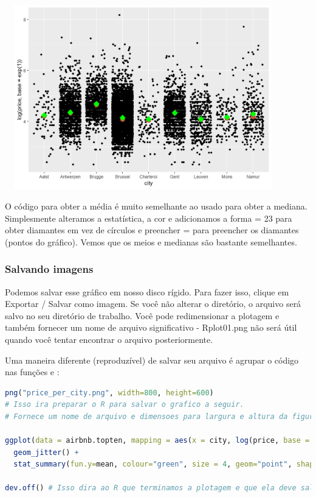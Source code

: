 \documentclass{article}
\begin{document}
\begin{center}
\includegraphics[width=12cm,height=8cm]{intro_plot_mean-1.png}
\end{center}

O código para obter a média é muito semelhante ao usado para obter a mediana. Simplesmente alteramos a estatística, a cor e adicionamos a forma = 23 para obter diamantes em vez de círculos e preencher =  para preencher os diamantes (pontos do gráfico). Vemos que os meios e medianas são bastante semelhantes.

\newpage
\subsubsection{Salvando imagens}

Podemos salvar esse gráfico em nosso disco rígido. Para fazer isso, clique em Exportar / Salvar como imagem. Se você não alterar o diretório, o arquivo será salvo no seu diretório de trabalho. Você pode redimensionar a plotagem e também fornecer um nome de arquivo significativo - Rplot01.png não será útil quando você tentar encontrar o arquivo posteriormente.

Uma maneira diferente (reproduzível) de salvar seu arquivo é agrupar o código nas funções  e :

\begin{lstlisting}[language=R]
png("price_per_city.png", width=800, height=600) 
# Isso ira preparar o R para salvar o grafico a seguir. 
# Fornece um nome de arquivo e dimensoes para largura e altura da figura em pixels

ggplot(data = airbnb.topten, mapping = aes(x = city, log(price, base = exp(1)))) + 
  geom_jitter() +
  stat_summary(fun.y=mean, colour="green", size = 4, geom="point", shape = 23, fill = "green") # Somente mantivemos a media aqui

dev.off() # Isso dira ao R que terminamos a plotagem e que ela deve salvar a plotagem no disco rigido.
\end{lstlisting}
\end{document}

